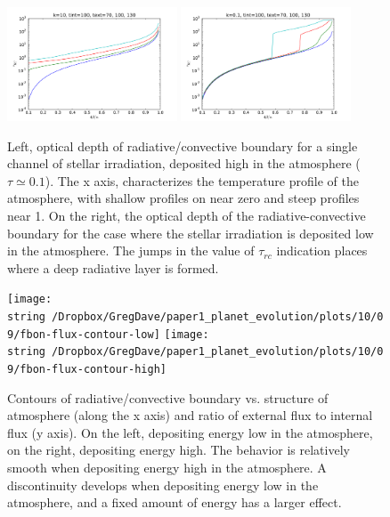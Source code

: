 \documentclass{emulateapj}
\begin{document}
\begin{figure}
  \centering
  \includegraphics[width=0.45\textwidth]{taurc-vs-text-high}
  \hfill
  \includegraphics[width=0.45\textwidth]{taurc-vs-text-low}
  \caption{Left, optical depth of radiative/convective boundary for a
    single channel of stellar irradiation, deposited high in the
    atmosphere ($\tau\simeq 0.1$).  The x axis, characterizes the
    temperature profile of the atmosphere, with shallow profiles on
    near zero and steep profiles near 1.  On the right, the optical
    depth of the radiative-convective boundary for the case where the
    stellar irradiation is deposited low in the atmosphere.  The jumps
    in the value of $\tau_{rc}$ indication places where a deep
    radiative layer is formed.}
  \label{fig:detached-radiative-zones}
\end{figure}

\begin{figure}
  \centering
  \texttt{[image: \\string~/Dropbox/GregDave/paper1\_planet\_evolution/plots/10/09/fbon-flux-contour-low]}
  \hfill
  \texttt{[image: \\string~/Dropbox/GregDave/paper1\_planet\_evolution/plots/10/09/fbon-flux-contour-high]}
  \caption{Contours of radiative/convective boundary vs. structure of
    atmosphere (along the x axis) and ratio of external flux to
    internal flux (y axis).  On the left, depositing energy low in
    the atmosphere, on the right, depositing energy high.  The
    behavior is relatively smooth when depositing energy high in the
    atmosphere.  A discontinuity develops when depositing energy low
    in the atmosphere, and a fixed amount of energy has a larger
    effect.  }
  \label{fig:atmosphere-vs-flux}
\end{figure}
\end{document}
